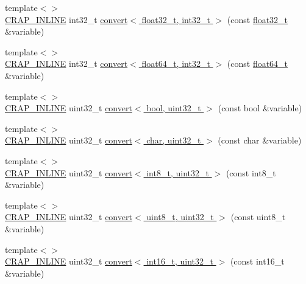 \begin{DoxyCompactItemize}
\item 
{\footnotesize template$<$$>$ }\\\hyperlink{config__x86_8h_a5a40526b8d842e7ff731509998bb0f1c}{C\+R\+A\+P\+\_\+\+I\+N\+L\+I\+N\+E} int32\+\_\+t \hyperlink{namespacecrap_a045a6994e54aa69045f37e6e4411fff2}{convert$<$ float32\+\_\+t, int32\+\_\+t $>$} (const \hyperlink{crap__types_8h_a4611b605e45ab401f02cab15c5e38715}{float32\+\_\+t} \&variable)
\item 
{\footnotesize template$<$$>$ }\\\hyperlink{config__x86_8h_a5a40526b8d842e7ff731509998bb0f1c}{C\+R\+A\+P\+\_\+\+I\+N\+L\+I\+N\+E} int32\+\_\+t \hyperlink{namespacecrap_aa358f7da86c4d07bc8a6bee447427fa2}{convert$<$ float64\+\_\+t, int32\+\_\+t $>$} (const \hyperlink{crap__types_8h_ac55f3ae81b5bc9053760baacf57e47f4}{float64\+\_\+t} \&variable)
\item 
{\footnotesize template$<$$>$ }\\\hyperlink{config__x86_8h_a5a40526b8d842e7ff731509998bb0f1c}{C\+R\+A\+P\+\_\+\+I\+N\+L\+I\+N\+E} uint32\+\_\+t \hyperlink{namespacecrap_aece15dfafe39298514a2b4d2c488994b}{convert$<$ bool, uint32\+\_\+t $>$} (const bool \&variable)
\item 
{\footnotesize template$<$$>$ }\\\hyperlink{config__x86_8h_a5a40526b8d842e7ff731509998bb0f1c}{C\+R\+A\+P\+\_\+\+I\+N\+L\+I\+N\+E} uint32\+\_\+t \hyperlink{namespacecrap_a2374171de1b2f137cbf0b27d0af1c397}{convert$<$ char, uint32\+\_\+t $>$} (const char \&variable)
\item 
{\footnotesize template$<$$>$ }\\\hyperlink{config__x86_8h_a5a40526b8d842e7ff731509998bb0f1c}{C\+R\+A\+P\+\_\+\+I\+N\+L\+I\+N\+E} uint32\+\_\+t \hyperlink{namespacecrap_ab60ee8dd4e0a4264fd5c1a24c3faeafa}{convert$<$ int8\+\_\+t, uint32\+\_\+t $>$} (const int8\+\_\+t \&variable)
\item 
{\footnotesize template$<$$>$ }\\\hyperlink{config__x86_8h_a5a40526b8d842e7ff731509998bb0f1c}{C\+R\+A\+P\+\_\+\+I\+N\+L\+I\+N\+E} uint32\+\_\+t \hyperlink{namespacecrap_a5b2a9e7f09553c2c2f61e23271999088}{convert$<$ uint8\+\_\+t, uint32\+\_\+t $>$} (const uint8\+\_\+t \&variable)
\item 
{\footnotesize template$<$$>$ }\\\hyperlink{config__x86_8h_a5a40526b8d842e7ff731509998bb0f1c}{C\+R\+A\+P\+\_\+\+I\+N\+L\+I\+N\+E} uint32\+\_\+t \hyperlink{namespacecrap_a7eaed95b8d0c79294406b7333c3bcfe7}{convert$<$ int16\+\_\+t, uint32\+\_\+t $>$} (const int16\+\_\+t \&variable)

\end{DoxyCompactItemize}
